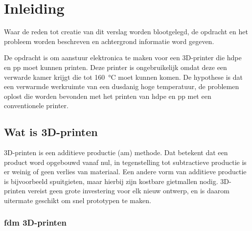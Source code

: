 \chapter{Inleiding}
\label{inleiding}

\begin{center}
    \begin{minipage}{0.5\textwidth}
        \begin{small}
            Waar de reden tot creatie van dit verslag worden blootgelegd, de
            opdracht en het probleem worden beschreven en achtergrond
            informatie word gegeven.
        \end{small}
    \end{minipage}
    \vspace{0.5cm}
\end{center}

\noindent De opdracht is om aanstuur elektronica te maken voor een 3D-printer
die \ac{hdpe} en \ac{pp} moet kunnen printen. Deze printer is ongebruikelijk
omdat deze een verwarde kamer krijgt die tot \SI{160}{\celsius} moet kunnen
komen. De hypothese is dat een verwarmde werkruimte van een dusdanig hoge
temperatuur, de problemen oplost die worden bevonden met het printen van
\ac{hdpe} en \ac{pp} met een conventionele printer.

\section{Wat is 3D-printen}

3D-printen is een additieve productie (\ac{am}) methode. Dat betekent dat een
product word opgebouwd vanaf nul, in tegenstelling tot subtractieve productie
is er weinig of geen verlies van materiaal.  Een andere vorm van additieve
productie is bijvoorbeeld spuitgieten, maar hierbij zijn kostbare gietmallen
nodig. 3D-printen vereist geen grote investering voor elk nieuw ontwerp, en is
daarom uitermate geschikt om snel prototypen te maken. \cite{ATTARAN2017677}

\subsection{\ac{fdm} 3D-printen}

